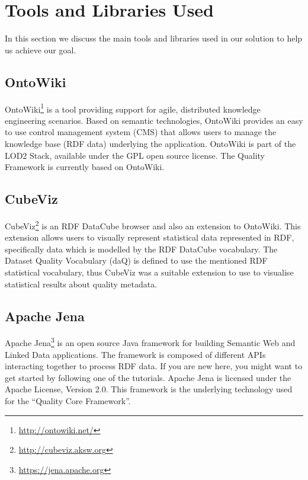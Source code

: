 
\section{Tools and Libraries Used}
\label{sec:Libraries} 

In this section we discuss the main tools and libraries used in our solution to help us achieve our goal.

\subsection{OntoWiki}
\label{sec:OntoWiki}
OntoWiki\footnote{\url{http://ontowiki.net/}} is a tool providing support for agile, distributed knowledge engineering scenarios.
Based on semantic technologies, OntoWiki provides an easy to use control management system (CMS) that allows users to manage the knowledge base (RDF data) underlying the application.
OntoWiki is part of the LOD2 Stack, available under the GPL open source license.
The Quality Framework is currently based on OntoWiki.

\subsection{CubeViz}
\label{sec:CubeViz}
CubeViz\footnote{\url{http://cubeviz.aksw.org}} is an RDF DataCube browser and also an extension to OntoWiki.
This extension allows users to visually represent statistical data represented in RDF, specifically data which is modelled by the RDF DataCube vocabulary.
The Dataset Quality Vocabulary (daQ) is defined to use the mentioned RDF statistical vocabulary, thus CubeViz was a suitable extension to use to visualise statistical results about quality metadata.


\subsection{Apache Jena}
\label{sec:Jena}
Apache Jena\footnote{\url{https://jena.apache.org}} is an open source Java framework for building Semantic Web and Linked Data applications.
The framework is composed of different APIs interacting together to process RDF data. If you are new here, you might want to get started by following one of the tutorials.
Apache Jena is licensed under the Apache License, Version 2.0. 
This framework is the underlying technology used for the ``Quality Core Framework''.

